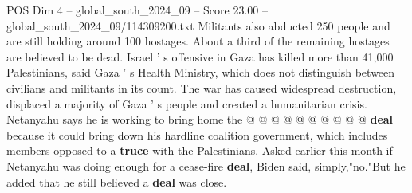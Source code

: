 \begin{textsample}{POS Dim 4 – global\_south\_2024\_09 – Score 23.00 – global\_south\_2024\_09/114309200.txt}
Militants also abducted 250 people and are still holding around 100 hostages.
About a third of the remaining hostages are believed to be dead.
Israel ' s offensive in Gaza has killed more than 41,000 Palestinians, said Gaza ' s Health Ministry, which does not distinguish between civilians and militants in its count.
The war has caused widespread destruction, displaced a majority of Gaza ' s people and created a humanitarian crisis.
Netanyahu says he is working to bring home the @ @ @ @ @ @ @ @ @ @ \textbf{deal} because it could bring down his hardline coalition government, which includes members opposed to a \textbf{truce} with the Palestinians.
Asked earlier this month if Netanyahu was doing enough for a cease-fire \textbf{deal}, Biden said, simply,"no."But he added that he still believed a \textbf{deal} was close.

\end{textsample}
